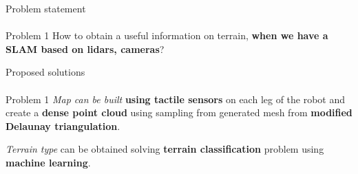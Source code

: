 \documentclass[aspectratio=169]{beamer}
\begin{document}

\begin{frame}[t]{Problem statement}
    \framesubtitle{}
    \begin{block}{Problem 1}
        \Large
        How to obtain a useful information on terrain, \textbf{when we have a SLAM based on lidars, cameras}?
        \vspace{5pt}

    \end{block}
\end{frame}

\begin{frame}[t]{Proposed solutions}
    \framesubtitle{}
    \begin{exampleblock}{Problem 1}
        \Large
        \textit{Map can be built} \textbf{using tactile sensors} on each leg of the robot and create a \textbf{dense point cloud} using sampling from generated mesh from \textbf{modified Delaunay triangulation}.
        \vspace{5pt}

        \textit{Terrain type} can be obtained solving \textbf{terrain classification} problem using \textbf{machine learning}.
    \end{exampleblock}
\end{frame}

\end{document}
